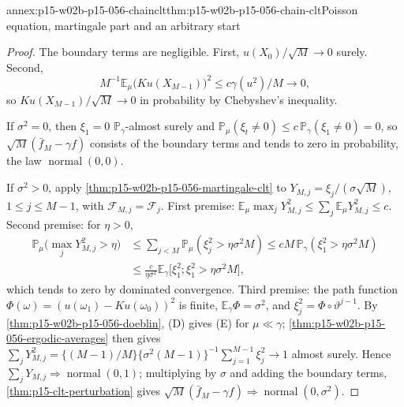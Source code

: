 \begin{annexitem}{annex:p15-w02b-p15-056-chainclt}{thm:p15-w02b-p15-056-chain-clt}{Poisson equation, martingale part and an arbitrary start}
\begin{proof}
The boundary terms are negligible. First, \(u(X_0)/\sqrt M\to0\)
surely. Second,
\[
 M^{-1}\mathbb E_\mu\bigl(Ku(X_{M-1})\bigr)^2\leq c\gamma(u^2)/M\to0,
\]
so \(Ku(X_{M-1})/\sqrt M\to0\) in probability by Chebyshev's inequality.

If \(\sigma^2=0\), then \(\xi_1=0\) \(\mathbb P_\gamma\)-almost surely and
\(\mathbb P_\mu(\xi_t\neq0)\leq c\,\mathbb P_\gamma(\xi_1\neq0)=0\), so
\(\sqrt M(\bar f_M-\gamma f)\) consists of the boundary terms and tends to
zero in probability, the law \(\operatorname{normal}(0,0)\).

If \(\sigma^2>0\), apply \cref{thm:p15-w02b-p15-056-martingale-clt} to
\(Y_{M,j}=\xi_j/(\sigma\sqrt M)\), \(1\leq j\leq M-1\), with
\(\mathcal F_{M,j}=\mathcal F_j\). First premise:
\(\mathbb E_\mu\max_jY_{M,j}^2\leq\sum_j\mathbb E_\mu Y_{M,j}^2\leq c\).
Second premise: for \(\eta>0\),
\[
\begin{split}
 \mathbb P_\mu\bigl(\max_jY_{M,j}^2>\eta\bigr)
 &\leq\sum_{j<M}\mathbb P_\mu(\xi_j^2>\eta\sigma^2M)
 \leq cM\,\mathbb P_\gamma(\xi_1^2>\eta\sigma^2M)\\
 &\leq\frac c{\eta\sigma^2}\mathbb E_\gamma\bigl[\xi_1^2;\xi_1^2>\eta\sigma^2M\bigr],
\end{split}
\]
which tends to zero by dominated convergence. Third premise: the path
function \(\Phi(\omega)=(u(\omega_1)-Ku(\omega_0))^2\) is finite,
\(\mathbb E_\gamma\Phi=\sigma^2\), and \(\xi_j^2=\Phi\circ\vartheta^{j-1}\).
By \cref{thm:p15-w02b-p15-056-doeblin}, (D) gives (E) for
\(\mu\ll\gamma\); \cref{thm:p15-w02b-p15-056-ergodic-averages} then gives
\(\sum_jY_{M,j}^2=\{(M-1)/M\}\{\sigma^2(M-1)\}^{-1}\sum_{j=1}^{M-1}\xi_j^2\to1\)
almost surely. Hence \(\sum_jY_{M,j}\Rightarrow\operatorname{normal}(0,1)\);
multiplying by \(\sigma\) and adding the boundary terms,
\cref{thm:p15-clt-perturbation} gives
\(\sqrt M(\bar f_M-\gamma f)\Rightarrow\operatorname{normal}(0,\sigma^2)\).


\end{proof}
\end{annexitem}
